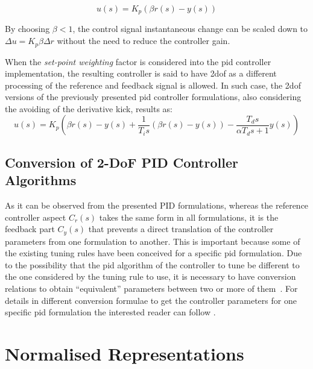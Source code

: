 \begin{equation}
u(s)=K_p(\beta r(s) - y(s))
\end{equation}

By choosing $\beta < 1$, the control signal instantaneous change can be scaled down to $\Delta u = K_p \beta \Delta r$  without the need to reduce the controller gain. 

When the \emph{set-point weighting} factor is considered into the \gls{pid} controller implementation, the resulting controller is said to have \gls{2dof} as a different processing of the reference and feedback signal is allowed. In such case, the \gls{2dof} versions of the previously presented \gls{pid} controller formulations, also considering the avoiding of the derivative kick, results as:
\begin{equation}
u(s)= K_p \left( \beta r(s) - y(s) + \frac{1}{T_i s} (\beta r(s) - y(s)) - \frac{T_ds}{\alpha T_d s+1} y(s) \right )
\label{eq:PIDstandard2DoF}
\end{equation}

\subsection{Conversion of 2-DoF PID Controller Algorithms}
As it can be observed from the presented PID formulations, whereas the reference controller aspect $C_r(s)$ takes the same form in all formulations, it is the feedback part $C_y(s)$  that prevents a direct translation of the controller parameters from one formulation to another. This is important because some of the existing tuning rules have been conceived for a specific \gls{pid} formulation. Due to the possibility that the \gls{pid} algorithm of the controller to tune be different to the one considered by the tuning rule to use, it is necessary to have conversion relations to obtain ``equivalent'' parameters between two or more of them~\citep{alfaroetfa2012-2, vilanova2017WEE}.  For details in different conversion formulae to get the controller parameters for one specific \gls{pid} formulation the interested reader can follow \citet{Alfaro2016}.


\section{Normalised Representations}
\label{sec:4}

